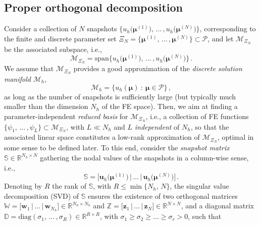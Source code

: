\documentclass[longtitle]{elsarticle}
\numberwithin{equation}{section}
\theoremstyle{theorem}
\theoremstyle{definition}
\theoremstyle{remark}
\theoremstyle{proposition}
\numberwithin{figure}{section}
\newcommand{\bg}[1]{\boldsymbol{#1}}
\begin{document}
		
	\subsection{Proper orthogonal decomposition}
	\label{section:Proper Orthogonal Decomposition} 
		
		Consider a collection of $N$ snapshots $\big\lbrace u_h \big( \bg{\mu}^{(1)} \big), \, \ldots \, , u_h \big( \bg{\mu}^{(N)} \big) \big\rbrace$, corresponding to the finite and discrete parameter set $\Xi_N = \big\lbrace \bg{\mu}^{(1)}, \, \ldots \, , \bg{\mu}^{(N)} \big\rbrace \subset \mathcal{P}$, and let $\mathcal{M}_{\Xi_N}$ be the associated subspace, i.e., \[ \mathcal{M}_{\Xi_N} = \text{span} \big\lbrace u_h \big( \bg{\mu}^{(1)} \big), \, \ldots \, , u_h \big( \bg{\mu}^{(N)} \big) \big\rbrace \, . \] We assume that $\mathcal{M}_{\Xi_N}$ provides a good approximation of the \emph{discrete solution manifold} $\mathcal{M}_h$, \[ \mathcal{M}_h = \big\lbrace u_h(\bg{\mu}) ~ : ~ \bg{\mu} \in \mathcal{P} \big\rbrace \, , \] as long as the number of snapshots is sufficiently large (but typically much smaller than the dimension ${N_h}$ of the FE space). Then, we aim at finding a parameter-independent \emph{reduced basis} for $\mathcal{M}_{\Xi_N}$, i.e., a collection of FE functions $\big\lbrace \psi_1, \, \ldots \, , \psi_L \big\rbrace \subset \mathcal{M}_{\Xi_N}$, with $L \ll {N_h}$ and $L$ \emph{independent} of $N_h$, so that the associated linear space constitutes a low-rank approximation of $\mathcal{M}_{\Xi_N}$, optimal in some sense to be defined later. To this end, consider the \emph{snapshot matrix} $\mathbb{S} \in \mathbb{R}^{{N_h} \times N}$ gathering the nodal values of the snapshots in a column-wise sense, i.e.,
		\begin{equation*}
			\mathbb{S} = \big[ \mathbf{u}_h \big( \bg{\mu}^{(1)} \big) \, \big| \, \ldots \, \big| \, \mathbf{u}_h \big( \bg{\mu}^{(N)} \big) \big] \, .
		\end{equation*}
		Denoting by $R$ the rank of $\mathbb{S}$, with $R \leq \min \big\lbrace{ {N_h}, \, N \big\rbrace}$, the singular value decomposition (SVD) of $\mathbb{S}$ ensures the existence of two orthogonal matrices $\mathbb{W} = \big[ \mathbf{w}_1 \, \big| \, \ldots \, \big| \, \mathbf{w}_{N_h} \big] \in \mathbb{R}^{{N_h} \times {N_h}}$ and $\mathbb{Z} = \big[ \mathbf{z}_1 \, \big| \, \ldots \, \big| \, \mathbf{z}_N \big] \in \mathbb{R}^{N \times N}$, and a diagonal matrix $\mathbb{D} = \text{diag}(\sigma_1, \, \ldots \, , \sigma_R) \in \mathbb{R}^{R \times R}$, with $\sigma_1 \geq \sigma_2 \geq \ldots \geq \sigma_r > 0$, such that
\end{document}
